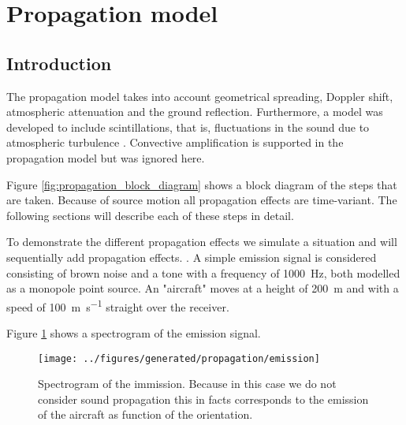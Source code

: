 \section{Propagation model}

\subsection{Introduction}
The propagation model takes into account geometrical spreading, Doppler shift,
atmospheric attenuation and the ground reflection. Furthermore, a model was
developed to include scintillations, that is, fluctuations in the sound due to atmospheric
turbulence \cite{Rietdijk2017}. Convective amplification is supported in the
propagation model but was ignored here.

Figure \ref{fig:propagation_block_diagram} shows a block diagram of the steps
that are taken. Because of source motion all propagation effects are
time-variant. The following sections will describe each of these steps in
detail.

To demonstrate the different propagation effects we simulate a situation and
will sequentially add propagation effects. . A simple
emission signal is considered consisting of brown noise and a tone with a
frequency of \SI{1000}{\hertz}, both modelled as a monopole point source. An
"aircraft" moves at a height of \SI{200}{\meter} and with a speed of
\SI{100}{\meter\per\second} straight over the receiver.

Figure \ref{fig:implementation:propagation:emission} shows a spectrogram of the
emission signal.

\begin{figure}[H]
  \centering
  \texttt{[image: ../figures/generated/propagation/emission]}
  \caption{Spectrogram of the immission. Because in this case we do not consider sound propagation this in facts corresponds to the emission of the aircraft as function of the orientation.}
  \label{fig:implementation:propagation:emission}
\end{figure}

